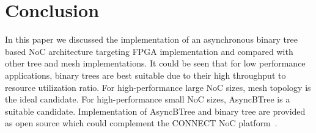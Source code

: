 \section{Conclusion}
\label{sec:conclusion}
In this paper we discussed the implementation of an asynchronous binary tree based NoC architecture targeting FPGA implementation and compared with other tree and mesh implementations.
It could be seen that for low performance applications, binary trees are best suitable due to their high throughput to resource utilization ratio.
For high-performance large NoC sizes, mesh topology is the ideal candidate.
For high-performance small NoC sizes, AsyncBTree is a suitable candidate.
Implementation of AsyncBTree and binary tree are provided as open source which could complement the CONNECT NoC platform~\cite{hnoc}.
